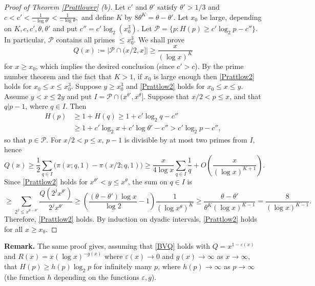 \documentclass[12pt]{amsart}
\theoremstyle{remark}
\theoremstyle{plain}
\numberwithin{equation}{section}
\newcommand{\be}{\begin{equation}}
\newcommand{\ee}{\end{equation}}
\renewcommand{\th}{\ensuremath{\theta}}
\newcommand{\eps}{\ensuremath{\varepsilon}}
\renewcommand{\(}{\left(}
\renewcommand{\)}{\right)}
\newcommand{\pfrac}[2]{\left(\frac{#1}{#2}\right)}
\renewcommand{\le}{\leqslant}
\renewcommand{\ge}{\geqslant}
\begin{document}
\begin{proof}[Proof of Theorem \ref{Prattlower} (b)]
Let $c'$ and $\th'$ satisfy $\th' > 1/3$ and
$c < c' < \frac{1}{-\log \th'} < \frac{1}{-\log \th},$
and define $K$ by $8\theta^K = \th-\th'.$
Let $x_0$ be large, depending on $K,c,c',\th,\th'$ and put
$c''=c'\log_2 (x_0^3)$.  Let
$\mathcal{P}=\{p : H(p)\ge c'\log_2 p - c''\}.$
In particular, $\mathcal{P}$ contains all primes $\le x_0^3$.  We
shall prove
\be\label{Prattlow2}
Q(x) := \left| \mathcal{P} \cap (x/2,x] \right| \ge\frac{x}{(\log
    x)^K}
\ee for $x\ge x_0$, which implies the desired conclusion (since $c'>c$). By the
prime number theorem and the fact that $K>1$, if $x_0$ is large
enough then \eqref{Prattlow2} holds for $x_0 \le x \le x_0^3$.
Suppose $y\ge x_0^3$ and \eqref{Prattlow2} holds for $x_0 \le x \le
y$.  Assume $y<x\le 2y$ and put $I = \mathcal{P} \cap
(x^{\th'},x^{\th}]$.
  Suppose that $x/2<p\le x$, and that $q|p-1$, where
$q\in I$.  Then
\begin{align*}
H(p) &\ge 1 + H(q) \ge 1 + c' \log_2 q - c'' \\
&\ge 1+ c' \log_2 x + c' \log \th' - c'' > c'\log_2 p - c'',
\end{align*}
so that $p\in \mathcal{P}$.
For $x/2<p\le x$, $p-1$ is divisible by at most two primes from
  $I$, hence
\[
Q(x) \ge \frac12 \sum_{q\in I} \Big( \pi(x;q,1)-\pi(x/2;q,1) \Big) 
\ge \frac{x}{4\log x} \sum_{q\in I} \frac{1}{q} + O\pfrac{x}{(\log x)^{K+1}}.
\]
Since \eqref{Prattlow2} holds for $x^{\th'} < y \le x^{\th}$, the sum
on $q\in I$ is
\[
\ge \sum_{2^j \le
    x^{\th-\th'}} \frac{Q(2^j x^{\th'})}{2^j x^{\th'}}
\ge  \( \frac{(\th-\th')\log x}{\log 2} - 1 \) \frac{1}{(\log
  x^{\th})^K}
\ge \frac{\th-\th'}{\th^K(\log x)^{K-1}}
= \frac{8}{(\log x)^{K-1}}.
\]
Therefore, \eqref{Prattlow2} holds.  By induction on dyadic intervals,
\eqref{Prattlow2} holds for all $x\ge x_0$.
\end{proof}

{\bf Remark.}  The same proof gives,
assuming that \eqref{BVQ} holds with $Q=x^{1-\eps(x)}$ and $R(x)=x(\log x)^{-g(x)}$
where $\eps(x)\to 0$ and $g(x)\to\infty$ as $x\to \infty$, that $H(p) \ge
h(p) \log_2 p$ for infinitely many $p$, where $h(p)\to \infty$ as
$p\to \infty$ (the function $h$ depending on the functions $\eps, g$).

\end{document}
